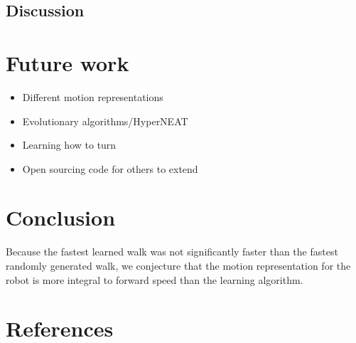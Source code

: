 \subsection{Discussion}

\section{Future work}
\begin{itemize}
\item Different motion representations
\item Evolutionary algorithms/HyperNEAT\cite{2}
\item Learning how to turn
\item Open sourcing code for others to extend
\end{itemize}

\section{Conclusion}
Because the fastest learned walk was not
significantly faster than the fastest randomly generated walk, we
conjecture that the motion representation for the robot is more
integral to forward speed than the learning algorithm.

\section{References}

